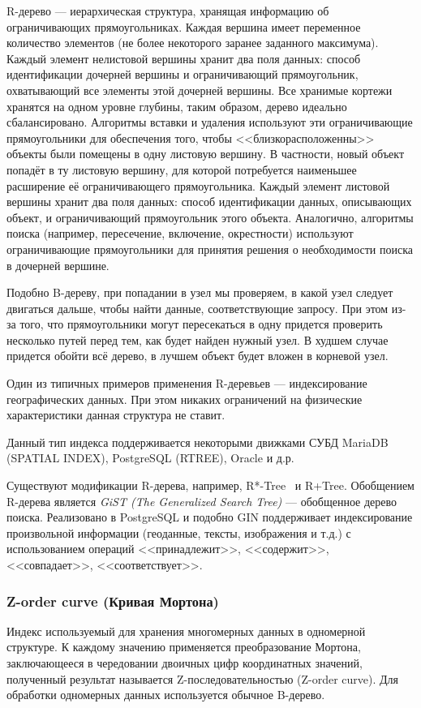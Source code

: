 R-дерево --- иерархическая структура, хранящая информацию об ограничивающих прямоугольниках.
Каждая вершина имеет переменное количество элементов (не более некоторого заранее заданного максимума).
Каждый элемент нелистовой вершины хранит два поля данных: способ идентификации дочерней вершины и ограничивающий прямоугольник, охватывающий все элементы этой дочерней вершины.
Все хранимые кортежи хранятся на одном уровне глубины, таким образом, дерево идеально сбалансировано.
Алгоритмы вставки и удаления используют эти ограничивающие прямоугольники для обеспечения того,
чтобы <<близкорасположенны>> объекты были помещены в одну листовую вершину.
В частности, новый объект попадёт в ту листовую вершину, для которой потребуется наименьшее расширение её ограничивающего прямоугольника.
Каждый элемент листовой вершины хранит два поля данных: способ идентификации данных, описывающих объект, и ограничивающий прямоугольник этого объекта.
Аналогично, алгоритмы поиска (например, пересечение, включение, окрестности) используют ограничивающие прямоугольники для принятия решения о необходимости поиска в дочерней вершине.

Подобно B-дереву, при попадании в узел мы проверяем, в какой узел следует двигаться дальше,
чтобы найти данные, соответствующие запросу.
При этом из-за того, что прямоугольники могут пересекаться в одну придется проверить несколько путей
перед тем, как будет найден нужный узел.
В худшем случае придется обойти всё дерево, в лучшем объект будет вложен в корневой узел.

Один из типичных примеров применения R-деревьев --- индексирование географических данных.
При этом никаких ограничений на физические характеристики данная структура не ставит.

Данный тип индекса поддерживается некоторыми движками СУБД MariaDB (SPATIAL INDEX), PostgreSQL (RTREE), Oracle и д.р.


Существуют модификации R-дерева, например, R*-Tree~\cite{beckmann1990rstree} и R+Tree.
Обобщением R-дерева является \textit{GiST (The Generalized Search Tree)} --- обобщенное дерево поиска.
Реализовано в PostgreSQL и подобно GIN поддерживает индексирование произвольной информации (геоданные, тексты, изображения и т.д.) с использованием операций <<принадлежит>>, <<содержит>>, <<совпадает>>, <<соответствует>>.

\subsubsection{Z-order curve (Кривая Мортона)}
Индекс используемый для хранения многомерных данных в одномерной структуре. К каждому значению применяется преобразование Мортона, заключающееся в чередовании двоичных цифр координатных значений, полученный результат называется Z-последовательностью (Z-order curve). Для обработки одномерных данных используется обычное B-дерево.

